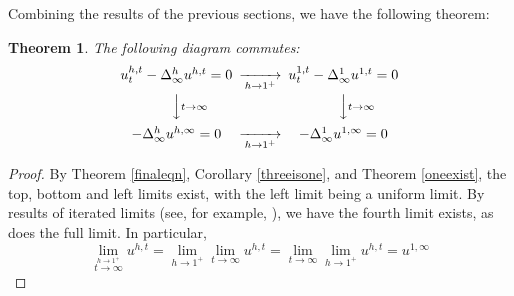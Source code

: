 \documentclass[12pt]{amsart}
\newtheorem{thm}{Theorem}[section]
\theoremstyle{definition}
\theoremstyle{remark}
\numberwithin{equation}{section}
\begin{document}
Combining the results of the previous sections, we have the following theorem:
\begin{thm}
The following diagram commutes: 
$$\begin{CD}
u^{h,t}_t-\Delta^h_{\infty}u^{h,t}=0 @>>{h\to 1^+}>u^{1,t}_t-\Delta^1_{\infty}u^{1,t}=0 \\
@VV{t\to \infty}V                @VV{t\to\infty}V \\
-\Delta^h_{\infty}u^{h,\infty}=0 @>>{h\to 1^+}> -\Delta^1_{\infty}u^{1,\infty}=0
\end{CD}$$
\end{thm}
\begin{proof}
By Theorem \ref{finaleqn}, Corollary \ref{threeisone}, and Theorem \ref{oneexist}, the top, bottom and left limits exist, with the left limit being a uniform limit. By results of iterated limits (see, for example, \cite{Ba}), we have the fourth limit exists, as does the full limit. In particular, 
$$\lim_{\stackrel{h \to 1^+}{t\to\infty}}u^{h,t}=\lim_{h \to 1^+}\lim_{t\to\infty}u^{h,t}=\lim_{t\to\infty}\lim_{h \to 1^+}u^{h,t}=u^{1,\infty}$$

\end{proof}
\end{document}
